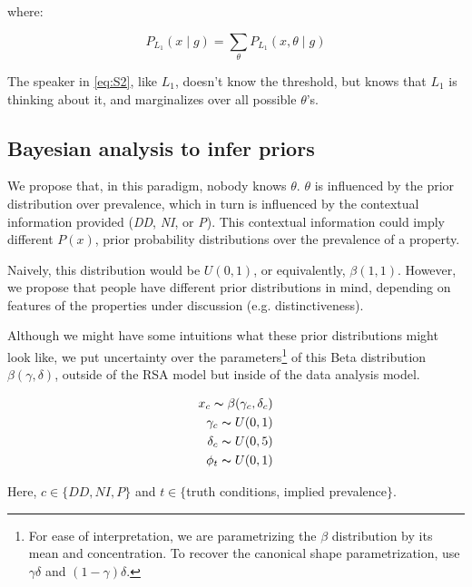 \documentclass[10pt,letterpaper]{article}
\begin{document}
where: 

$$ P_{L_{1}}(x \mid g) = \sum_{\theta} P_{L_{1}}(x , \theta \mid g) $$

%			
%			

The speaker in \eqref{eq:S2}, like $L_{1}$, doesn't know the threshold, but knows that $L_{1}$ is thinking about it, and marginalizes over all possible $\theta$'s.

\subsection{Bayesian analysis to infer priors}

We propose that, in this paradigm, nobody knows $\theta$.  $\theta$ is influenced by the prior distribution over prevalence, which in turn is influenced by the contextual information provided (\emph{DD}, \emph{NI}, or \emph{P}). This contextual information could imply different $P(x)$, prior probability distributions over the prevalence of a property. 

Naively, this distribution would be $U(0,1)$, or equivalently, $\beta(1,1)$. However, we propose that people have different prior distributions in mind, depending on features of the properties under discussion (e.g. distinctiveness).

Although we might have some intuitions what these prior distributions might look like, we put uncertainty over the parameters\footnote{For ease of interpretation, we are parametrizing the $\beta$ distribution by its mean and concentration. To recover the canonical shape parametrization, use $\gamma \delta$ and $(1-\gamma)\delta$.} of this Beta distribution $\beta(\gamma,\delta)$, outside of the RSA model but inside of the data analysis model. 

\begin{align*}
x_{c} \thicksim \beta(\gamma_{c},\delta_{c}) \\
\gamma_{c} \thicksim U(0,1) \\
\delta_{c} \thicksim U(0,5) \\
\phi_{t} \thicksim U(0,1) 
\end{align*}

Here, $c \in \{DD,NI,P\}$ and $t \in \{$truth conditions, implied prevalence$\}$.
\end{document}
